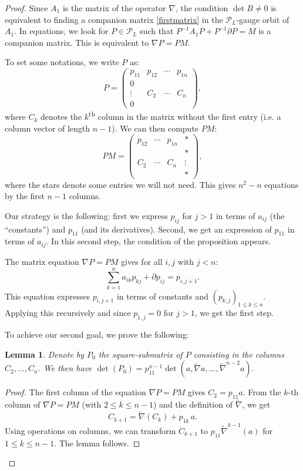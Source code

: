 \documentclass[11pt]{amsart}
\newtheorem{lemma}[thm]{Lemma}
\numberwithin{thm}{section} %
\numberwithin{equation}{section} %
\numberwithin{figure}{section} %
\begin{document}
\begin{proof}
Since $A_1$ is the matrix of the operator $\nabla$, the condition $\det B\neq 0$ is equivalent to finding a companion matrix \eqref{firstmatrix} in the $\mathcal{P}_L$-gauge orbit of $A_1$.
In equations, we look for $P\in\mathcal{P}_L$ such that $P^{-1}A_1P+P^{-1}\partial P=M$ is a companion matrix. This is equivalent to $\nabla P=PM.$

To set some notations, we write $P$ as:
$$P= \begin{pmatrix}
	p_{11} & p_{12} & \cdots &p_{1n} \\
	0 & &  &  \\
	\vdots & C_2& \cdots& C_n \\
	0 &  &  & 
\end{pmatrix},$$
where $C_k$ denotes the $k$\textsuperscript{th} column in the matrix without the first entry (i.e. a column vector of length $n-1$).
We can then compute $PM$:
$$PM=\begin{pmatrix}p_{12}&\cdots &p_{1n}&*\\ &&&* \\ C_2&\cdots &C_n&\vdots \\ &&&*\end{pmatrix},$$
where the stars denote some entries we will not need. This gives $n^2-n$ equations by the first $n-1$ columns.

Our strategy is the following: first we express $p_{ij}$ for $j>1$ in terms of $a_{ij}$ (the ``constants'') and $p_{11}$ (and its derivatives). Second, we get an expression of $p_{11}$ in terms of $a_{ij}$. In this second step, the condition of the proposition appears.

The matrix equation $\nabla P=PM$ gives for all $i,j$ with $j<n$:
\begin{equation}\label{auxmat}
\sum_{k=1}^n a_{ik}p_{kj}+\partial p_{ij} = p_{i,j+1}.
\end{equation} 
This equation expresses $p_{i,j+1}$ in terms of constants and $(p_{k,j})_{1\leq k\leq n}$. Applying this recursively and since $p_{1,j}=0$ for $j>1$, we get the first step.

To achieve our second goal, we prove the following:
\begin{lemma}
Denote by $P_0$ the square-submatrix of $P$ consisting in the columns $C_2, ..., C_n$. We then have $\det(P_0) = p_{11}^{n-1}\det(a,\widetilde{\nabla}a,...,\widetilde{\nabla}^{n-2}a).$
\end{lemma}
\begin{proof}
The first column of the equation $\nabla P=PM$ gives $C_2=p_{11}a$. From the $k$-th column of $\nabla P=PM$ (with $2\leq k\leq n-1$) and the definition of $\widetilde{\nabla}$, we get $$C_{k+1}=\widetilde{\nabla}(C_k)+p_{1k}\, a.$$
Using operations on columns, we can transform $C_{k+1}$ to $p_{11}\widetilde{\nabla}^{k-1}(a)$ for $1\leq k\leq n-1$. The lemma follows.
\end{proof}


\end{proof}
\end{document}
